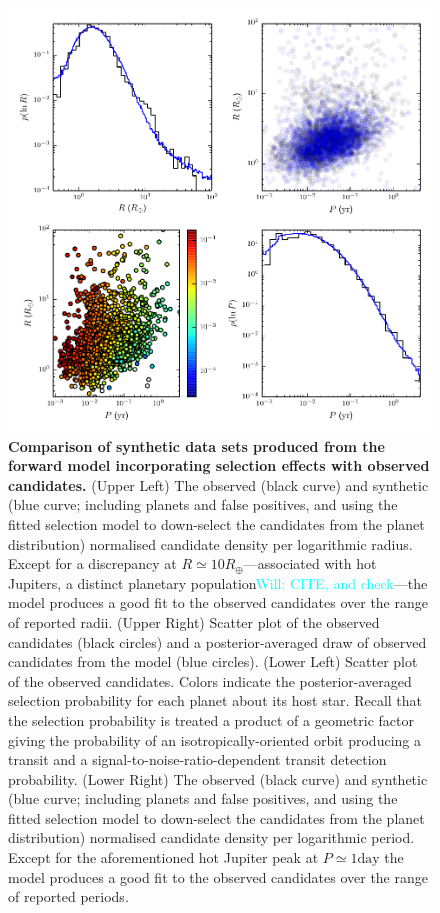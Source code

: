 \documentclass{nature}
\newcommand{\REarth}{R_\oplus}
\newcommand{\Will}[1]{\textcolor{cyan}{Will: #1}}
\begin{document}
\begin{figure}
  \includegraphics[width=\columnwidth]{selection}
  \caption{\label{fig:selection} \textbf{Comparison of synthetic data
      sets produced from the forward model incorporating selection
      effects with observed candidates.}  (Upper Left) The observed
    (black curve) and synthetic (blue curve; including planets and
    false positives, and using the fitted selection model to
    down-select the candidates from the planet distribution)
    normalised candidate density per logarithmic radius.  Except for a
    discrepancy at $R \simeq 10 \REarth$---associated with hot
    Jupiters, a distinct planetary population\Will{CITE, and
      check}---the model produces a good fit to the observed
    candidates over the range of reported radii.  (Upper Right)
    Scatter plot of the observed candidates (black circles) and a
    posterior-averaged draw of observed candidates from the model
    (blue circles).  (Lower Left) Scatter plot of the observed
    candidates.  Colors indicate the posterior-averaged selection
    probability for each planet about its host star.  Recall that the
    selection probability is treated a product of a geometric factor
    giving the probability of an isotropically-oriented orbit
    producing a transit and a signal-to-noise-ratio-dependent transit
    detection probability.  (Lower Right) The observed (black curve)
    and synthetic (blue curve; including planets and false positives,
    and using the fitted selection model to down-select the candidates
    from the planet distribution) normalised candidate density per
    logarithmic period.  Except for the aforementioned hot Jupiter
    peak at $P \simeq 1 \mathrm{day}$ the model produces a good fit to
    the observed candidates over the range of reported periods.}
\end{figure}
\end{document}
